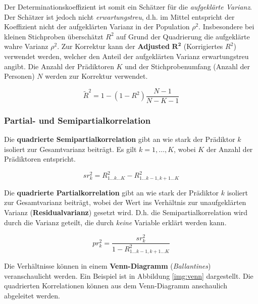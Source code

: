\documentclass{article}
\numberwithin{equation}{section}
\begin{document}
Der Determinationskoeffizient ist somit ein Schätzer für die \emph{aufgeklärte Varianz}. Der Schätzer ist jedoch nicht \emph{erwartungstreu}, d.h. im Mittel entspricht der Koeffizient nicht der aufgeklärten Varianz in der Population $\rho^2$. Insbesondere bei kleinen Stichproben überschätzt $R^2$ auf Grund der Quadrierung die aufgeklärte wahre Varianz $\rho^2$. Zur Korrektur kann der \textbf{Adjusted} $\mathbf{R^2}$ (Korrigiertes $R^2$) verwendet werden, welcher den Anteil der aufgeklärten Varianz erwartungstreu angibt. Die Anzahl der Prädiktoren $K$ und der Stichprobenumfang (Anzahl der Personen) $N$ werden zur Korrektur verwendet.

\begin{equation}
\tilde{R}^2 = 1 - (1-R^2) \frac{N-1}{N-K-1}
\end{equation}

\subsubsection{Partial- und Semipartialkorrelation}

Die \textbf{quadrierte Semipartialkorrelation} gibt an wie stark der Prädiktor $k$ isoliert zur Gesamtvarianz beiträgt. Es gilt $k = 1,\dots,K$, wobei $K$ der Anzahl der Prädiktoren entspricht.

\begin{equation}
sr_k^2 = R^2_{1\dots k\dots K} - R^2_{1\dots k-1, k+1\dots K}
\end{equation}

Die \textbf{quadrierte Partialkorrelation} gibt an wie stark der Prädiktor $k$ isoliert zur Gesamtvarianz beiträgt, wobei der Wert ins Verhältnis zur unaufgeklärten Varianz (\textbf{Residualvarianz}) gesetzt wird. D.h. die Semipartialkorrelation wird durch die Varianz geteilt, die durch \emph{keine} Variable erklärt werden kann.

\begin{equation}
pr_k^2 = \frac{sr_k^2}{1 - R^2_{1\dots k-1, k+1\dots K}}
\end{equation}

Die Verhältnisse können in einem \textbf{Venn-Diagramm} (\emph{Ballantines}) veranschaulicht werden. Ein Beispiel ist in Abbildung \ref{img:venn} dargestellt. Die quadrierten Korrelationen können aus dem Venn-Diagramm anschaulich abgeleitet werden.
\end{document}
